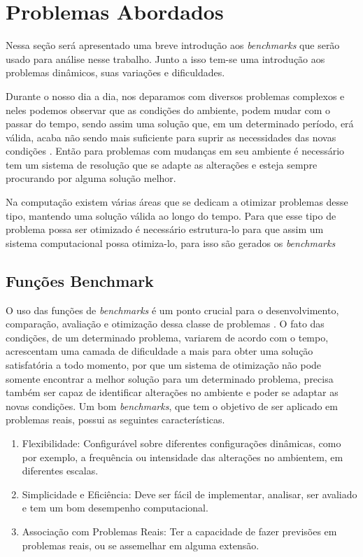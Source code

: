 \chapter{Problemas Abordados}
\label{ch:problemas}
Nessa seção será apresentado uma breve introdução aos \textit{benchmarks} que serão usado para análise nesse trabalho. Junto a isso tem-se uma introdução aos problemas dinâmicos, suas variações e dificuldades.

Durante o nosso dia a dia, nos deparamos com diversos problemas complexos e neles podemos observar que as condições do ambiente, podem mudar com o passar do tempo, sendo assim uma solução que, em um determinado período, erá válida, acaba não sendo mais suficiente para suprir as necessidades das novas condições \cite{branke2012evolutionary}. Então para problemas com mudanças em seu ambiente é necessário tem um sistema de resolução que se adapte as alterações e esteja sempre procurando por alguma solução melhor.

Na computação existem várias áreas que se dedicam a otimizar problemas desse tipo, mantendo uma solução válida ao longo do tempo. Para que esse tipo de problema possa ser otimizado é necessário estrutura-lo para que assim um sistema computacional possa otimiza-lo, para isso são gerados os \textit{benchmarks}


\section{Funções Benchmark}
\label{sec:revisao_benchmark}
O uso das funções de \textit{benchmarks} é um ponto crucial para o desenvolvimento, comparação, avaliação e otimização dessa classe de problemas \cite{evolution_dynamic}. 
O fato das condições, de um determinado problema, variarem de acordo com o tempo, acrescentam uma camada de dificuldade a mais para obter uma solução satisfatória a todo momento, por que um sistema de otimização não pode somente encontrar a melhor solução para um determinado problema, precisa também ser capaz de identificar alterações no ambiente e poder se adaptar as novas condições.
Um bom \textit{benchmarks}, que tem o objetivo de ser aplicado em problemas reais, possui as seguintes características.

\begin{enumerate}  
\item Flexibilidade: Configurável sobre diferentes configurações dinâmicas, como por exemplo, a frequência ou intensidade das alterações no ambientem, em diferentes escalas.

\item Simplicidade e Eficiência: Deve ser fácil de implementar, analisar, ser avaliado e tem um bom desempenho computacional.

\item Associação com Problemas Reais: Ter a capacidade de fazer previsões em problemas reais, ou se assemelhar em alguma extensão.
\end{enumerate}

